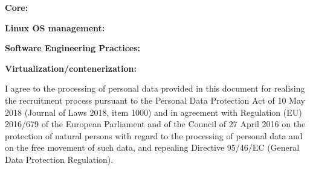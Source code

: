 \documentclass[10pt,a4paper,ragged2e,withhyper]{altacv/altacv}
\begin{document}
\begin{paracol}{2}
\textbf{Core:} \normalsize\smallskip\\
\medskip

\textbf{Linux OS management:} \normalsize\smallskip\\
\medskip

\textbf{Software Engineering Practices:} \normalsize\smallskip\\
\medskip

\textbf{Virtualization/contenerization:} \normalsize\smallskip\\





\medskip















\end{paracol}

I agree to the processing of personal data provided in this document for realising the recruitment process pursuant to the Personal Data Protection Act of 10 May 2018 (Journal of Laws 2018, item 1000) and in agreement with Regulation (EU) 2016/679 of the European Parliament and of the Council of 27 April 2016 on the protection of natural persons with regard to the processing of personal data and on the free movement of such data, and repealing Directive 95/46/EC (General Data Protection Regulation).
\end{document}
